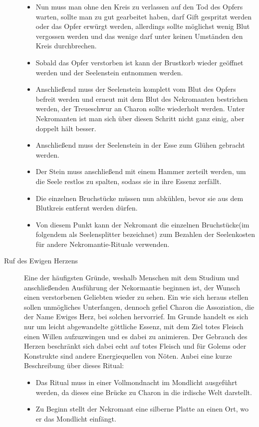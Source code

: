 \documentclass[a4paper,12pt,oneside]{book}
\begin{document}
\begin{description}
\begin{itemize}
\item Nun muss man ohne den Kreis zu verlassen auf den Tod des Opfers warten, sollte man zu gut gearbeitet haben, darf Gift gespritzt werden oder das Opfer erwürgt werden, allerdings sollte möglichst wenig Blut vergossen werden und das wenige darf unter keinen Umständen den Kreis durchbrechen.
\item Sobald das Opfer verstorben ist kann der Brustkorb wieder geöffnet werden und der Seelenstein entnommen werden.
\item Anschließend muss der Seelenstein komplett vom Blut des Opfers befreit werden und erneut mit dem Blut des Nekromanten bestrichen werden, der Treueschwur an Charon sollte wiederholt werden. Unter Nekromanten ist man sich über diesen Schritt nicht ganz einig, aber doppelt hält besser.
\item Anschließend muss der Seelenstein in der Esse zum Glühen gebracht werden.
\item Der Stein muss anschließend mit einem Hammer zerteilt werden, um die Seele restlos zu spalten, sodass sie in ihre Essenz zerfällt.
\item Die einzelnen Bruchstücke müssen nun abkühlen, bevor sie aus dem Blutkreis entfernt werden dürfen.
\item Von diesem Punkt kann der Nekromant die einzelnen Bruchstücke(im folgendem als Seelensplitter bezeichnet) zum Bezahlen der Seelenkosten für andere Nekromantie-Rituale verwenden.  
\end{itemize}
\item[Ruf des Ewigen Herzens] Eine der häufigsten Gründe, weshalb Menschen mit dem Studium und anschließenden Ausführung der Nekormantie beginnen ist, der Wunsch einen verstorbenen Geliebten wieder zu sehen. Ein wie sich heraus stellen sollen unmögliches Unterfangen, dennoch gefiel Charon die Assoziation, die der Name Ewiges Herz\label{Ewiges Herz}, bei solchen hervorrief. Im Grunde handelt es sich nur um leicht abgewandelte göttliche Essenz, mit dem Ziel totes Fleisch einen Willen aufzuzwingen und es dabei zu animieren. Der Gebrauch des Herzen beschränkt sich dabei echt auf totes Fleisch und für Golems oder Konstrukte sind andere Energiequellen von Nöten.
Anbei eine kurze Beschreibung über dieses Ritual:
\begin{itemize}
\item Das Ritual muss in einer Vollmondnacht im Mondlicht ausgeführt werden, da dieses eine Brücke zu Charon in die irdische Welt darstellt.
\item Zu Beginn stellt der Nekromant eine silberne Platte an einen Ort, wo er das Mondlicht einfängt.

\end{itemize}
\end{description}
\end{document}
